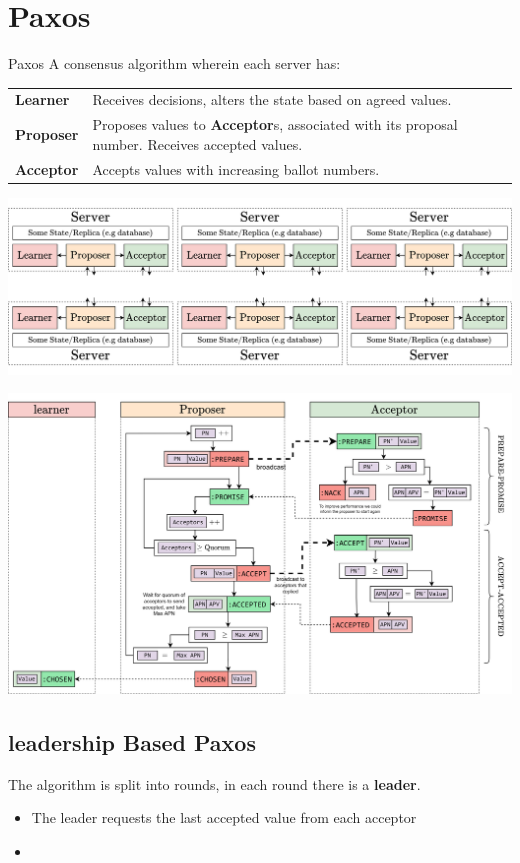 \section{Paxos}
\begin{definitionbox}{Paxos}
    A consensus algorithm wherein each server has:
    \begin{center}
        \begin{tabular}{l p{}}
            \textbf{Learner} & Receives decisions, alters the state based on agreed values. \\
            \textbf{Proposer} & Proposes values to \textbf{Acceptor}s, associated with its proposal number. Receives accepted values. \\
            \textbf{Acceptor} & Accepts values with increasing ballot numbers. \\
        \end{tabular}
    \end{center}
\end{definitionbox}
\begin{center}
    \includegraphics[width=\textwidth]{consensus/images/paxos_servers.drawio.png}
\end{center}

\begin{center}
    \includegraphics[width=\textwidth]{consensus/images/paxos_stages.drawio.png}
\end{center}
\unfinished

\subsection{leadership Based Paxos}
The algorithm is split into rounds, in each round there is a \textbf{leader}.
\begin{itemize}
    \item The leader requests the last accepted value from each acceptor
    \item  
\end{itemize}
\unfinished
